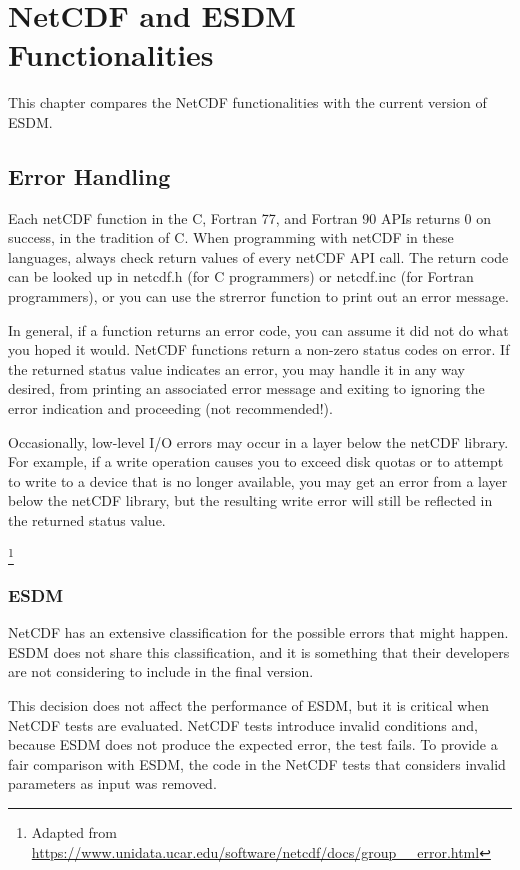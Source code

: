 \chapter{NetCDF and ESDM Functionalities}
\label{ch:func}

This chapter compares the NetCDF functionalities with the current version of ESDM.

\section{Error Handling}

{\itshape

Each netCDF function in the C, Fortran 77, and Fortran 90 APIs returns 0 on success, in the tradition of C.
When programming with netCDF in these languages, always check return values of every netCDF API call.
The return code can be looked up in netcdf.h (for C programmers) or netcdf.inc (for Fortran programmers), or you can use the strerror function to print out an error message.

In general, if a function returns an error code, you can assume it did not do what you hoped it would.
NetCDF functions return a non-zero status codes on error.
If the returned status value indicates an error, you may handle it in any way desired, from printing an associated error message and exiting to ignoring the error indication and proceeding (not recommended!).

Occasionally, low-level I/O errors may occur in a layer below the netCDF library.
For example, if a write operation causes you to exceed disk quotas or to attempt to write to a device that is no longer available, you may get an error from a layer below the netCDF library, but the resulting write error will still be reflected in the returned status value.
}\footnote{Adapted from \url{https://www.unidata.ucar.edu/software/netcdf/docs/group__error.html}}

\subsection{ESDM}

NetCDF has an extensive classification for the possible errors that might happen.
ESDM does not share this classification, and it is something that their developers are not considering to include in the final version.

This decision does not affect the performance of ESDM, but it is critical when NetCDF tests are evaluated.
NetCDF tests introduce invalid conditions and, because ESDM does not produce the expected error, the test fails.
To provide a fair comparison with ESDM, the code in the NetCDF tests that considers invalid parameters as input was removed.

